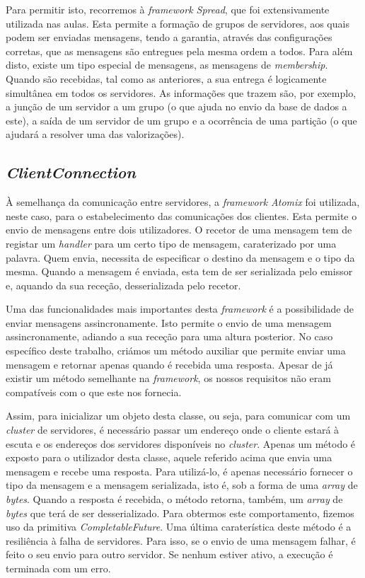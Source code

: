 \documentclass[a4paper]{report}
\begin{document}
{				Para permitir isto, recorremos à \textit{framework Spread}, que foi extensivamente utilizada nas aulas. Esta permite a formação de grupos de servidores, aos quais podem ser enviadas mensagens, tendo a garantia, através das configurações corretas, que as mensagens são entregues pela mesma ordem a todos. Para além disto, existe um tipo especial de mensagens, as mensagens de \textit{membership}. Quando são recebidas, tal como as anteriores, a sua entrega é logicamente simultânea em todos os servidores. As informações que trazem são, por exemplo, a junção de um servidor a um grupo (o que ajuda no envio da base de dados a este), a saída de um servidor de um grupo e a ocorrência de uma partição (o que ajudará a resolver uma das valorizações).

		\subsection{\textit{ClientConnection}} \label{subsec:ClientConnection}
			À semelhança da comunicação entre servidores, a \textit{framework Atomix} foi utilizada, neste caso, para o estabelecimento das comunicações dos clientes. Esta permite o envio de mensagens entre dois utilizadores. O recetor de uma mensagem tem de registar um \textit{handler} para um certo tipo de mensagem, caraterizado por uma palavra. Quem envia, necessita de especificar o destino da mensagem e o tipo da mesma. Quando a mensagem é enviada, esta tem de ser serializada pelo emissor e, aquando da sua receção, desserializada pelo recetor.
			
			Uma das funcionalidades mais importantes desta \textit{framework} é a possibilidade de enviar mensagens assincronamente. Isto permite o envio de uma mensagem assincronamente, adiando a sua receção para uma altura posterior. No caso específico deste trabalho, criámos um método auxiliar que permite enviar uma mensagem e retornar apenas quando é recebida uma resposta. Apesar de já existir um método semelhante na \textit{framework}, os nossos requisitos não eram compatíveis com o que este nos fornecia.
			
			Assim, para inicializar um objeto desta classe, ou seja, para comunicar com um \textit{cluster} de servidores, é necessário passar um endereço onde o cliente estará à escuta e os endereços dos servidores disponíveis no \textit{cluster}. Apenas um método é exposto para o utilizador desta classe, aquele referido acima que envia uma mensagem e recebe uma resposta. Para utilizá-lo, é apenas necessário fornecer o tipo da mensagem e a mensagem serializada, isto é, sob a forma de uma \textit{array} de \textit{bytes}. Quando a resposta é recebida, o método retorna, também, um \textit{array} de \textit{bytes} que terá de ser desserializado. Para obtermos este comportamento, fizemos uso da primitiva \textit{CompletableFuture}. Uma última caraterística deste método é a resiliência à falha de servidores. Para isso, se o envio de uma mensagem falhar, é feito o seu envio para outro servidor. Se nenhum estiver ativo, a execução é terminada com um erro.
	
}
\end{document}
